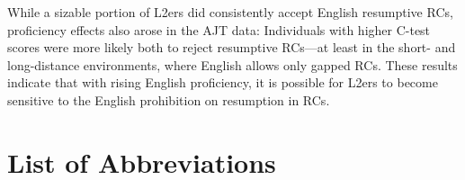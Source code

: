 While a sizable portion of L2ers did consistently accept English resumptive RCs, proficiency effects also arose in the AJT data: Individuals with higher C-test scores were more likely both to reject resumptive RCs---at least in the short- and long-distance environments, where English allows only gapped RCs. These results indicate that with rising English proficiency, it is possible for L2ers to become sensitive to the English prohibition on resumption in RCs.

\newpage


\renewcommand{\contentsname}{\vspace{-27pt} \begin{center} \normalsize \textbf{TABLE OF CONTENTS} \end{center} \vspace{-1.5cm}}
\renewcommand\thepage{\romannumeral\numexpr\value{page}\relax}
{}
\tableofcontents
\newpage


\renewcommand{\listtablename}{\vspace{-80pt} \begin{center} \normalsize \textbf{LIST OF TABLES} \end{center} \vspace{-1.5cm}}
\listoftables
{}
\newpage


\renewcommand{\listfigurename}{\vspace{-77pt} \begin{center} \normalsize \textbf{LIST OF FIGURES} \end{center} \vspace{-1.5cm}}
\listoffigures
{}


\chapter*{List of Abbreviations}
\renewcommand\thepage{\romannumeral\numexpr\value{page}\relax}

